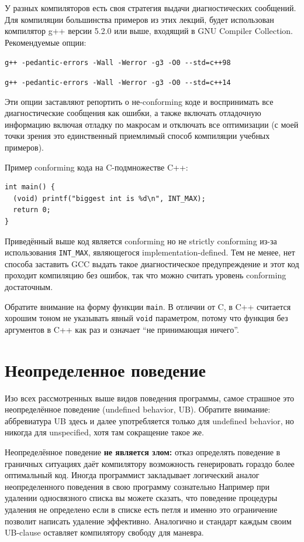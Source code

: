 \documentclass[a4paper,12pt,oneside]{book}
\begin{document}
У разных компиляторов есть своя стратегия выдачи диагностических сообщений. Для компиляции большинства примеров из этих лекций, будет использован компилятор g++ версии 5.2.0 или выше, входящий в GNU Compiler Collection. Рекомендуемые опции: 

\lstinline!g++ -pedantic-errors -Wall -Werror -g3 -O0 --std=c++98!

\lstinline!g++ -pedantic-errors -Wall -Werror -g3 -O0 --std=c++14!

Эти опции заставляют репортить о не-conforming коде и воспринимать все диагностические сообщения как ошибки, а также включать отладочную информацию включая отладку по макросам и отключать все оптимизации (с моей точки зрения это единственный приемлимый способ компиляции учебных примеров).

Пример conforming кода на C-подмножестве C++:

\begin{lstlisting}
int main() { 
  (void) printf("biggest int is %d\n", INT_MAX);
  return 0;
}
\end{lstlisting}

Приведённый выше код является conforming но не strictly conforming из-за использования \lstinline!INT_MAX!, являющегося implementation-defined. Тем не менее, нет способа заставить GCC выдать такое диагностическое предупреждение и этот код проходит компиляцию без ошибок, так что можно считать уровень conforming достаточным.

Обратите внимание на форму функции \lstinline!main!. В отличии от C, в C++ считается хорошим тоном не указывать явный \lstinline!void! параметром, потому что функция без аргументов в C++ как раз и означает ``не принимающая ничего''.

\pagebreak
\section{Неопределенное поведение}\label{UB}

Изо всех рассмотренных выше видов поведения программы, самое страшное это неопределённое поведение (undefined behavior, UB). Обратите внимание: аббревиатура UB здесь и далее употребляется только для undefined behavior, но никогда для unspecified, хотя там сокращение такое же.

Неопределённое поведение \textbf{не является злом:} отказ определять поведение в граничных ситуациях даёт компилятору возможность генерировать гораздо более оптимальный код. Иногда программист закладывает логический аналог неопределенного поведения в свою программу сознательно Например при удалении односвязного списка вы можете сказать, что поведение процедуры удаления не определено если в списке есть петля и именно это ограничение позволит написать удаление эффективно. Аналогично и стандарт каждым своим UB-clause оставляет компилятору свободу для маневра.
\end{document}
